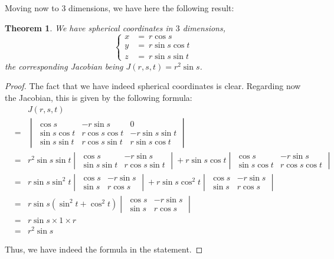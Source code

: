 \documentclass[12pt]{amsbook}
\newtheorem{theorem}{Theorem}[chapter]
\begin{document}
Moving now to 3 dimensions, we have here the following result:


\begin{theorem}
We have spherical coordinates in $3$ dimensions,
$$\begin{cases}
x\!\!\!&=\ r\cos s\\
y\!\!\!&=\ r\sin s\cos t\\
z\!\!\!&=\ r\sin s\sin t
\end{cases}$$
the corresponding Jacobian being $J(r,s,t)=r^2\sin s$.
\end{theorem}

\begin{proof}
The fact that we have indeed spherical coordinates is clear. Regarding now the Jacobian, this is given by the following formula:
\begin{eqnarray*}
&&J(r,s,t)\\
&=&\begin{vmatrix}
\cos s&-r\sin s&0\\
\sin s\cos t&r\cos s\cos t&-r\sin s\sin t\\
\sin s\sin t&r\cos s\sin t&r\sin s\cos t
\end{vmatrix}\\
&=&r^2\sin s\sin t
\begin{vmatrix}\cos s&-r\sin s\\ \sin s\sin t&r\cos s\sin t\end{vmatrix}
+r\sin s\cos t\begin{vmatrix}\cos s&-r\sin s\\ \sin s\cos t&r\cos s\cos t\end{vmatrix}\\
&=&r\sin s\sin^2 t
\begin{vmatrix}\cos s&-r\sin s\\ \sin s&r\cos s\end{vmatrix}
+r\sin s\cos^2 t\begin{vmatrix}\cos s&-r\sin s\\ \sin s&r\cos s\end{vmatrix}\\
&=&r\sin s(\sin^2t+\cos^2t)\begin{vmatrix}\cos s&-r\sin s\\ \sin s&r\cos s\end{vmatrix}\\
&=&r\sin s\times 1\times r\\
&=&r^2\sin s
\end{eqnarray*}

Thus, we have indeed the formula in the statement.
\end{proof}
\end{document}
